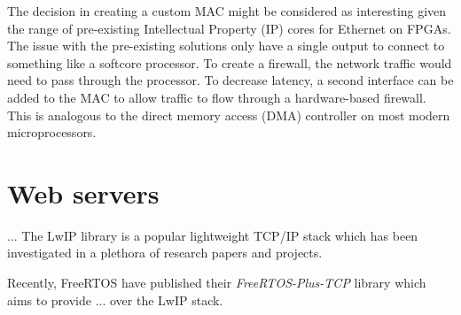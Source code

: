 The decision in creating a custom MAC might be considered as interesting given the range of pre-existing Intellectual 
Property (IP) cores for Ethernet on FPGAs. The issue with the pre-existing solutions only have a single output to connect to something like a softcore
processor. To create a firewall, the network traffic would need to pass through the processor. To decrease latency, a second interface can be added 
to the MAC to allow traffic to flow through a hardware-based firewall. This is analogous to the direct memory access (DMA) controller on most modern 
microprocessors. 




\section{Web servers}
... The LwIP library is a popular lightweight TCP/IP stack which has been investigated in a plethora of research papers and projects. 


Recently, FreeRTOS have published their \textit{FreeRTOS-Plus-TCP} library which aims to provide ... over the LwIP stack. 







